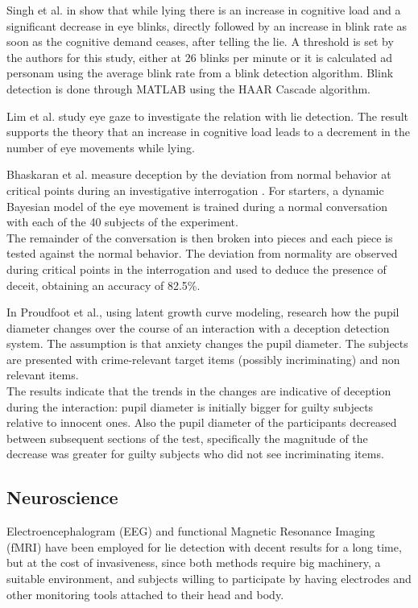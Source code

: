 Singh et al. in \cite{7324092} show that while lying there is an increase in cognitive load and a significant decrease in eye blinks, directly followed by an increase in blink rate as soon as the cognitive demand ceases, after telling the lie. A threshold is set by the authors for this study, either at 26 blinks per minute or it is calculated ad personam using the average blink rate from a blink detection algorithm. Blink detection is done through MATLAB using the HAAR Cascade algorithm.

Lim et al. study eye gaze \cite{Lim:2013:LTE:2535948.2535954} to investigate the relation with lie detection. The result supports the theory that an increase in cognitive load leads to a decrement in the number of eye movements while lying.

Bhaskaran et al. measure deception by the deviation from normal behavior at critical points during an investigative interrogation \cite{5771407} . For starters, a dynamic Bayesian model of the eye movement is trained during a normal conversation with each of the 40 subjects of the experiment. \\
The remainder of the conversation is then broken into pieces and each piece is tested against the normal behavior. The deviation from normality are observed during critical points in the interrogation and used to deduce the presence of deceit, obtaining an accuracy of 82.5\%.

In \cite{7165946} Proudfoot et al., using latent growth curve modeling, research how the pupil diameter changes over the course of an interaction with a deception detection system. The assumption is that anxiety changes the pupil diameter. The subjects are presented with crime-relevant target items (possibly incriminating) and non relevant items. \\
The results indicate that the trends in the changes are indicative of deception during the interaction: pupil diameter is initially bigger for guilty subjects relative to innocent ones. Also the pupil diameter of the participants decreased between subsequent sections of the test, specifically the magnitude of the decrease was greater for guilty subjects who did not see incriminating items.

\subsection{Neuroscience} \label{neuro}
Electroencephalogram (EEG) and functional Magnetic Resonance Imaging (fMRI) have been employed for lie detection with decent results for a long time, but at the cost of invasiveness, since both methods require big machinery, a suitable environment, and subjects willing to participate by having electrodes and other monitoring tools attached to their head and body.

